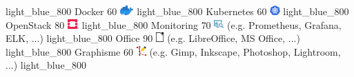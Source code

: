 \documentclass[
  paper=a4,
  fontsize=10pt
]{resume}
\begin{document}
{        {light_blue_800}
      \skill%
        {Docker}%
        {60}%
        {\includegraphics[height=1em]{skill/docker.png}}%
        {}%
        {light_blue_800}
      \skill%
        {Kubernetes}%
        {60}%
        {\includegraphics[height=1em]{skill/kubernetes.png}}%
        {}%
        {light_blue_800}
      \skill%
        {OpenStack}%
        {80}%
        {\includegraphics[height=1em]{skill/openstack.png}}%
        {}%
        {light_blue_800}
      \skill%
        {Monitoring}%
        {70}%
        {\includegraphics[height=1em]{skill/monitoring2.png}}%
        {(e.g. Prometheus, Grafana, ELK, ...)}%
        {light_blue_800}
      \skill%
        {Office}%
        {90}%
        {\includegraphics[height=1em]{skill/office.png}}%
        {(e.g. LibreOffice, MS Office, ...)}%
        {light_blue_800}
      \skill%
        {Graphisme}%
        {60}%
        {\includegraphics[height=1em]{skill/graphism.png}}%
        {(e.g. Gimp, Inkscape, Photoshop, Lightroom, ...)}%
        {light_blue_800}
}
\end{document}
